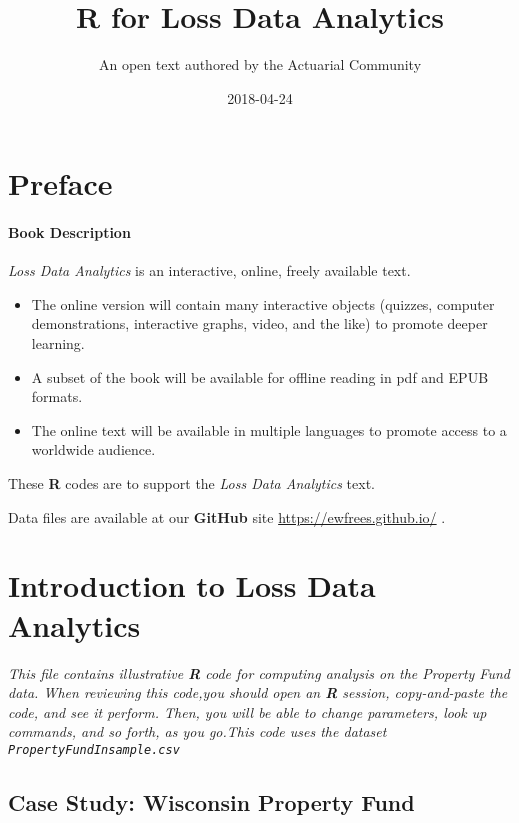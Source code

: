 \documentclass[]{book}
\title{R for Loss Data Analytics}
\author{An open text authored by the Actuarial Community}
\date{2018-04-24}
\providecommand{\tightlist}{%
  \setlength{\itemsep}{0pt}\setlength{\parskip}{0pt}}
\theoremstyle{definition}
\theoremstyle{definition}
\theoremstyle{definition}
\theoremstyle{remark}
\begin{document}
\maketitle

{
\setcounter{tocdepth}{1}
\tableofcontents
}
\chapter*{Preface}\label{preface}

\subsubsection*{Book Description}\label{book-description}

\emph{Loss Data Analytics} is an interactive, online, freely available
text.

\begin{itemize}
\tightlist
\item
  The online version will contain many interactive objects (quizzes,
  computer demonstrations, interactive graphs, video, and the like) to
  promote deeper learning.
\item
  A subset of the book will be available for offline reading in pdf and
  EPUB formats.
\item
  The online text will be available in multiple languages to promote
  access to a worldwide audience.
\end{itemize}

These \textbf{R} codes are to support the \emph{Loss Data Analytics}
text.

Data files are available at our \textbf{GitHub} site
\url{https://ewfrees.github.io/} .

\chapter{Introduction to Loss Data
Analytics}\label{introduction-to-loss-data-analytics}

\emph{This file contains illustrative \textbf{R} code for computing
analysis on the Property Fund data. When reviewing this code,you should
open an \textbf{R} session, copy-and-paste the code, and see it perform.
Then, you will be able to change parameters, look up commands, and so
forth, as you go.This code uses the dataset
\texttt{PropertyFundInsample.csv}}

\section{Case Study: Wisconsin Property
Fund}\label{case-study-wisconsin-property-fund}
\end{document}
